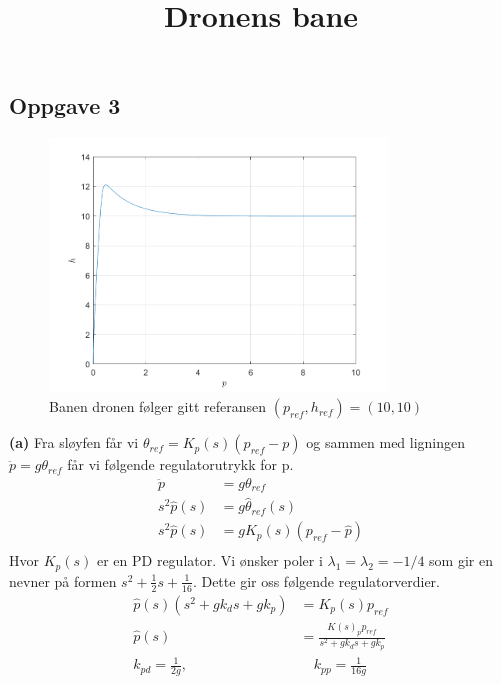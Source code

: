 \documentclass[11pt, a4paper, norsk]{rapport1} %
\begin{document}
\subsection{Oppgave 3}
\begin{figure}[H]
    \centering
    \title{\textbf{Dronens bane}}
    \includegraphics[width=0.8\textwidth]{figures/oppg3_bane.png}
    \caption{Banen dronen følger gitt referansen $(p_{ref}, h_{ref}) = (10, 10)$}
    \label{fig:4}
\end{figure}
\textbf{(a)} Fra sløyfen får vi $\theta_{ref} = K_p(s)(p_{ref} - p)$ og sammen med ligningen $\ddot{p} = g\theta_{ref}$ får vi følgende regulatorutrykk for p.
\begin{equation}
    \begin{aligned}
        \ddot{p} &= g\theta_{ref} \\
        s^2\hat{p}(s) &= g\hat{\theta}_{ref}(s) \\
        s^2\hat{p}(s) &= gK_p(s)(p_{ref} - \hat{p})\\
    \end{aligned}
\end{equation}
Hvor $K_p(s)$ er en PD regulator. Vi ønsker poler i $\lambda_1 = \lambda_2 = -1/4$ som gir en nevner på formen
$s^2 + \frac{1}{2}s + \frac{1}{16}$. Dette gir oss følgende regulatorverdier.
\begin{equation}
    \begin{aligned}
        \hat{p}(s)(s^2 + gk_ds + gk_p) &= K_p(s)p_{ref} \\
        \hat{p}(s) &= \frac{K(s)_pp_{ref}}{s^2 + gk_ds + gk_p} \\
        k_{pd} = \frac{1}{2g}, &\quad k_{pp} = \frac{1}{16g} \\
    \end{aligned}
\end{equation}
\end{document}
